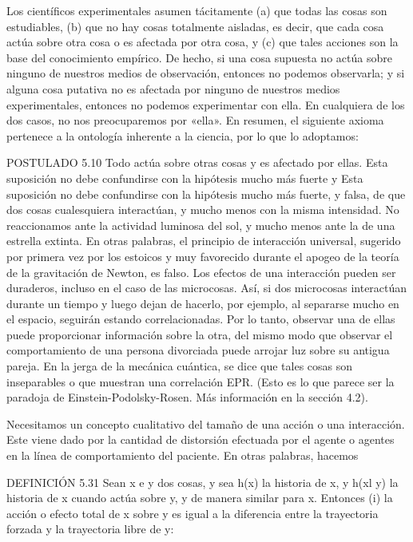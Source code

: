 \begin{justifying}
    Los científicos experimentales asumen tácitamente (a) que todas las cosas son estudiables,
    (b) que no hay cosas totalmente aisladas, es decir, que cada cosa actúa sobre otra cosa
    o es afectada por otra cosa, y (c) que tales acciones son la base
    del conocimiento empírico. De hecho, si una cosa supuesta no actúa sobre ninguno
    de nuestros medios de observación, entonces no podemos observarla; y si alguna
    cosa putativa no es afectada por ninguno de nuestros medios experimentales, entonces
    no podemos experimentar con ella. En cualquiera de los dos casos, no nos preocuparemos por «ella». En
    resumen, el siguiente axioma pertenece a la ontología inherente a la ciencia,
    por lo que lo adoptamos:

    POSTULADO 5.10 Todo actúa sobre otras cosas y es afectado por ellas.
    Esta suposición no debe confundirse con la hipótesis mucho más fuerte y
    Esta suposición no debe confundirse con la hipótesis mucho más fuerte, y
    falsa, de que dos cosas cualesquiera interactúan, y mucho menos con la misma
    intensidad. No reaccionamos ante la actividad luminosa del sol, y mucho menos
    ante la de una estrella extinta. En otras palabras, el principio de interacción universal,
    sugerido por primera vez por los estoicos y muy favorecido durante el
    apogeo de la teoría de la gravitación de Newton, es falso.
    Los efectos de una interacción pueden ser duraderos, incluso en el caso de
    las microcosas. Así, si dos microcosas interactúan durante un tiempo y luego dejan
    de hacerlo, por ejemplo, al separarse mucho en el espacio, seguirán
    estando correlacionadas. Por lo tanto, observar una de ellas puede proporcionar
    información sobre la otra, del mismo modo que observar el comportamiento de una
    persona divorciada puede arrojar luz sobre su antigua pareja. En la jerga de la
    mecánica cuántica, se dice que tales cosas son inseparables o que
    muestran una correlación EPR. (Esto es lo que parece ser la paradoja de Einstein-Podolsky-Rosen.
    Más información en la sección 4.2).

    \pagebreak

    Necesitamos un concepto cualitativo del tamaño de una acción o una interacción. Este viene dado por la cantidad de distorsión efectuada por el
    agente o agentes en la línea de comportamiento del paciente. En otras palabras, hacemos
    
    DEFINICIÓN 5.31 Sean x e y dos cosas, y sea h(x) la historia
    de x, y h(xl y) la historia de x cuando actúa sobre y, y de manera similar para
    x. Entonces
    (i) la acción o efecto total de x sobre y es igual a la diferencia entre
    la trayectoria forzada y la trayectoria libre de y:


\end{justifying}

